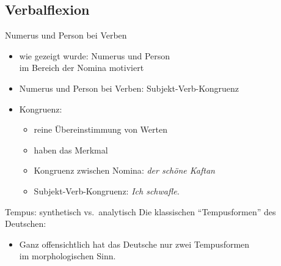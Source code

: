 \subsection{Verbalflexion}

\begin{frame}
  {Numerus und Person bei Verben}
  \pause
  \begin{itemize}[<+->]
    \item wie gezeigt wurde: \alert{Numerus} und \alert{Person}\\
      im Bereich der Nomina motiviert
    \item Numerus und Person bei Verben: Subjekt-Verb-Kongruenz 
      \Halbzeile
    \item Kongruenz:
      \begin{itemize}[<+->]
        \item reine \alert{Übereinstimmung von Werten}
        \item {} haben das Merkmal
        \item \alert{Kongruenz zwischen Nomina}: \textit{der schöne Kaftan}
        \item \alert{Subjekt-Verb-Kongruenz}: \textit{Ich schwafle.}
      \end{itemize}
  \end{itemize}
\end{frame}

\begin{frame}
  {Tempus: synthetisch vs.\ analytisch}
  \pause
  Die klassischen "`Tempusformen"' des Deutschen:\\
  \Halbzeile
  \pause
  \begin{center}
  \end{center}
  \pause
  \Halbzeile
  \begin{itemize}[<+->]
    \item \alert{Ganz offensichtlich hat das Deutsche nur zwei Tempusformen\\
      im morphologischen Sinn.}
  \end{itemize} 
\end{frame}

